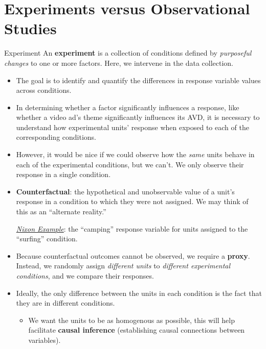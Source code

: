 \section{Experiments versus Observational Studies}
\begin{Definition}{Experiment}{}
    An \textbf{experiment} is a collection of conditions defined by
    \emph{purposeful changes} to one or more factors. Here, we intervene in the data collection.
\end{Definition}
\begin{itemize}
    \item The goal is to identify and quantify the differences in response variable values
          across conditions.
    \item In determining whether a factor significantly influences a response,
          like whether a video ad's theme significantly influences its AVD, it is
          necessary to understand how experimental units' response when exposed to each
          of the corresponding conditions.
    \item However, it would be nice if we could observe how the \emph{same} units behave in
          each of the experimental conditions, but we can't. We only observe their response in a
          single condition.
    \item \textbf{Counterfactual}: the hypothetical and unobservable value of a unit's response
          in a condition to which they were not assigned. We may think of this
          as an ``alternate reality.''
          \begin{Example}{}{}
              \emph{\hyperref[ex:nixon_ex]{Nixon Example}}: the ``camping'' response
              variable for units assigned to the ``surfing'' condition.
          \end{Example}
    \item Because counterfactual outcomes cannot be observed, we require a \textbf{proxy}.
          Instead, we randomly assign \emph{different units} to \emph{different experimental
              conditions},
          and we compare their responses.
    \item Ideally, the only difference between the units in each condition is the fact that
          they are in different conditions.
          \begin{itemize}
              \item We want the units to be as homogenous as possible, this will help facilitate
                    \textbf{causal inference} (establishing causal connections between variables).

\end{itemize}
\end{itemize}
